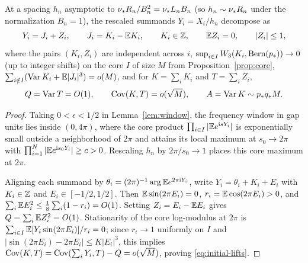 \begin{lemma}\label{lem:first-alias}
At a spacing $h_n$ asymptotic to $\nu_* R_n/B_n^2=\nu_* L_nB_n$ (so $h_n\sim\nu_* R_n$
under the normalization $B_n=1$), the rescaled summands
$Y_i=X_i/h_n$ decompose as
\[
 Y_i=J_i+Z_i,\qquad J_i=K_i-\mathbb E K_i,\qquad K_i\in\mathbb Z,\qquad
 \mathbb E Z_i=0,\qquad |Z_i|\le1,
\]
where the pairs $(K_i,Z_i)$ are independent across $i$, $\sup_{i\in I}W_3(K_i,\operatorname{Bern}(p_*))\to0$
(up to integer shifts) on the core $I$ of size $M$ from Proposition~\ref{prop:core},
$\sum_{i\notin I}(\operatorname{Var} K_i+\mathbb E|J_i|^3)=o(M)$, and for $K=\sum_i K_i$ and
$T=\sum_i Z_i$,
\begin{equation}\label{eq:initial-lifts}
 Q=\operatorname{Var} T=O(1),\qquad \operatorname{Cov}(K,T)=o(\sqrt M),\qquad
 A=\operatorname{Var} K\sim p_*q_* M.
\end{equation}
\end{lemma}
\begin{proof}
Taking $0<\epsilon<1/2$ in Lemma~\ref{lem:window}, the frequency window in
gap units lies inside $(0,4\pi)$, where the core product $\prod_{i\in I}|\mathbb E e^{\mathrm i sY_i}|$
is exponentially small outside a neighborhood of $2\pi$ and attains its local
maximum at $s_0\to2\pi$ with $\prod_{i=1}^N|\mathbb E e^{\mathrm i s_0Y_i}|\ge c>0$.
Rescaling $h_n$ by $2\pi/s_0\to1$ places this core maximum at $2\pi$.

Aligning each summand by $\theta_i=(2\pi)^{-1}\arg\mathbb E e^{2\pi\mathrm i Y_i}$, write
$Y_i=\theta_i+K_i+E_i$ with $K_i\in\mathbb Z$ and $E_i\in[-1/2,1/2]$. Then
$\mathbb E\sin(2\pi E_i)=0$, $r_i=\mathbb E\cos(2\pi E_i)>0$, and
$\sum_i\mathbb E E_i^2\le\frac18\sum_i(1-r_i)=O(1)$. Setting $Z_i=E_i-\mathbb E E_i$ gives
$Q=\sum_i\mathbb E Z_i^2=O(1)$. Stationarity of the core log-modulus at $2\pi$ is
$\sum_{i\in I}\mathbb E[Y_i\sin(2\pi E_i)]/r_i=0$; since $r_i\to1$ uniformly on $I$
and $|\sin(2\pi E_i)-2\pi E_i|\le K|E_i|^3$, this implies
$\operatorname{Cov}(K,T)=\operatorname{Cov}(\sum_i Y_i,T)-Q=o(\sqrt M)$, proving \eqref{eq:initial-lifts}.
\end{proof}
